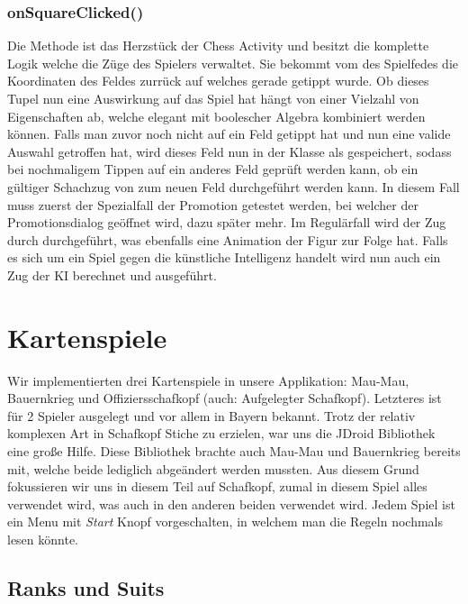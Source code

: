 \subsubsection{onSquareClicked()}

Die Methode  ist das Herzstück der Chess Activity und
besitzt die komplette Logik welche die Züge des Spielers verwaltet. Sie bekommt
vom  des Spielfedes die Koordinaten des Feldes zurrück auf
welches gerade getippt wurde. Ob dieses Tupel nun eine Auswirkung auf das Spiel
hat hängt von einer Vielzahl von Eigenschaften ab, welche elegant mit boolescher
Algebra kombiniert werden können. Falls man zuvor noch nicht auf ein Feld
getippt hat und nun eine valide Auswahl getroffen hat, wird dieses Feld nun in
der Klasse als  gespeichert, sodass bei nochmaligem Tippen auf ein
anderes Feld geprüft werden kann, ob ein gültiger Schachzug von 
zum neuen Feld durchgeführt werden kann. In diesem Fall muss zuerst der
Spezialfall der Promotion getestet werden, bei welcher der Promotionsdialog
geöffnet wird, dazu später mehr. Im Regulärfall wird der Zug durch
 durchgeführt, was ebenfalls eine Animation der Figur zur
Folge hat. Falls es sich um ein Spiel gegen die künstliche Intelligenz handelt
wird nun auch ein Zug der KI berechnet und ausgeführt.

\section{Kartenspiele}
\sectionauthor{\philipp}

Wir implementierten drei Kartenspiele in unsere Applikation: Mau-Mau,
Bauernkrieg und Offiziersschafkopf (auch: Aufgelegter Schafkopf). Letzteres ist
für 2 Spieler ausgelegt und vor allem in Bayern bekannt. Trotz der relativ
komplexen Art in Schafkopf Stiche zu erzielen, war uns die JDroid Bibliothek
eine große Hilfe. Diese Bibliothek brachte auch Mau-Mau und Bauernkrieg bereits
mit, welche beide lediglich abgeändert werden mussten.  Aus diesem Grund
fokussieren wir uns in diesem Teil auf Schafkopf, zumal in diesem Spiel alles
verwendet wird, was auch in den anderen beiden verwendet wird. Jedem Spiel ist
ein Menu mit \emph{Start} Knopf vorgeschalten, in welchem man die Regeln
nochmals lesen könnte.

\subsection{Ranks und Suits}

